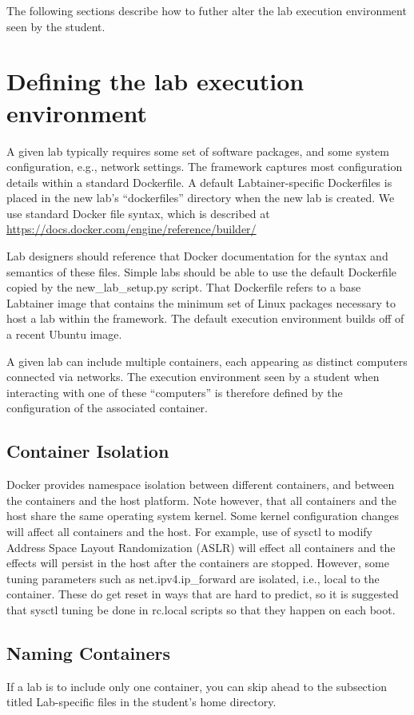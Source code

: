 \documentclass[12pt]{article}
\begin{document}
The following sections describe how to futher alter the lab execution environment seen by 
the student.

\section {Defining the lab execution environment}
A given lab typically requires some set of software packages, and some
system configuration, e.g., network settings.  
The framework captures most configuration details within a standard
Dockerfile.  A default Labtainer-specific Dockerfiles is placed in the new lab's ``dockerfiles'' 
directory when the new lab is created.  We use standard Docker file syntax, which is described at 
\url{https://docs.docker.com/engine/reference/builder/}

Lab designers should reference that Docker documentation for the 
syntax and semantics of these files.
Simple labs should be able to use the default Dockerfile copied by the 
new\_lab\_setup.py script.  That Dockerfile refers to a base Labtainer
image that contains the minimum set of Linux packages necessary to 
host a lab within the framework.  The default
execution environment builds off of a recent Ubuntu image.

A given lab can include multiple containers, each appearing as distinct
computers connected via networks.  The execution environment seen by a
student when interacting with one of these ``computers'' is therefore defined
by the configuration of the associated container.  

\subsection {Container Isolation}
Docker provides namespace isolation between different containers, and
between the containers and the host platform.  Note however, that all
containers and the host share the same operating system kernel.  Some
kernel configuration changes will affect all containers and the host.  For example,
use of sysctl to modify Address Space Layout Randomization (ASLR) will effect
all containers and the effects will persist in the host after the containers
are stopped.  However, some tuning parameters such as net.ipv4.ip\_forward are
isolated, i.e., local to the container. These do get reset in ways that are
hard to predict, so it is suggested that sysctl tuning be done in rc.local
scripts so that they happen on each boot.

\subsection {Naming Containers}
If a lab is to include only one container, you can
skip ahead to the subsection titled Lab-specific files in the student's home directory.
\end{document}
